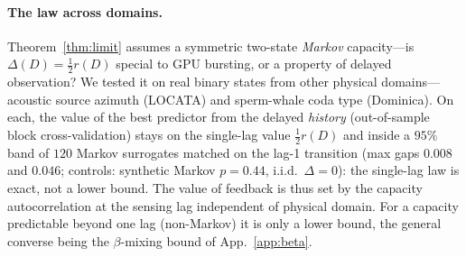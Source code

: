 \paragraph{The law across domains.}
Theorem~\ref{thm:limit} assumes a symmetric two-state \emph{Markov} capacity---is
$\Delta(D)=\tfrac12 r(D)$ special to GPU bursting, or a property of delayed observation?
We tested it on real binary states from other physical domains---acoustic source azimuth
(LOCATA) and sperm-whale coda type (Dominica). On each, the value of the best predictor
from the delayed \emph{history} (out-of-sample block cross-validation) stays on the
single-lag value $\tfrac12 r(D)$ and inside a $95\%$ band of $120$ Markov surrogates
matched on the lag-1 transition (max gaps $0.008$ and $0.046$; controls: synthetic Markov
$p{=}0.44$, i.i.d.\ $\Delta{=}0$): the single-lag law is exact, not a lower bound. The
value of feedback is thus set by the capacity autocorrelation at the sensing lag
independent of physical domain. For a capacity predictable beyond one lag (non-Markov) it
is only a lower bound, the general converse being the $\beta$-mixing bound of
App.~\ref{app:beta}.
